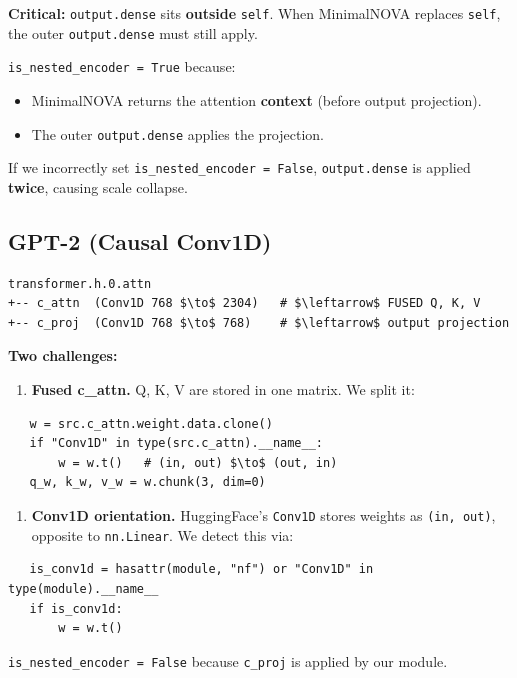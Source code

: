 \textbf{Critical:} \texttt{output.dense} sits \textbf{outside} \texttt{self}. When MinimalNOVA 
replaces \texttt{self}, the outer \texttt{output.dense} must still apply.

\texttt{is\_nested\_encoder = True} because:
\begin{itemize}
\item MinimalNOVA returns the attention \textbf{context} (before output projection).
\item The outer \texttt{output.dense} applies the projection.

\end{itemize}
If we incorrectly set \texttt{is\_nested\_encoder = False}, \texttt{output.dense} is applied 
\textbf{twice}, causing scale collapse.

\subsection{GPT-2 (Causal Conv1D)}

\begin{lstlisting}
transformer.h.0.attn
+-- c_attn  (Conv1D 768 $\to$ 2304)   # $\leftarrow$ FUSED Q, K, V
+-- c_proj  (Conv1D 768 $\to$ 768)    # $\leftarrow$ output projection
\end{lstlisting}

\textbf{Two challenges:}

\begin{enumerate}
\item \textbf{Fused c\_attn.} Q, K, V are stored in one matrix. We split it:
\end{enumerate}
\begin{lstlisting}
   w = src.c_attn.weight.data.clone()
   if "Conv1D" in type(src.c_attn).__name__:
       w = w.t()   # (in, out) $\to$ (out, in)
   q_w, k_w, v_w = w.chunk(3, dim=0)
\end{lstlisting}

\begin{enumerate}
\item \textbf{Conv1D orientation.} HuggingFace's \texttt{Conv1D} stores weights as
  \texttt{(in, out)}, opposite to \texttt{nn.Linear}. We detect this via:
\end{enumerate}
\begin{lstlisting}
   is_conv1d = hasattr(module, "nf") or "Conv1D" in type(module).__name__
   if is_conv1d:
       w = w.t()
\end{lstlisting}

\texttt{is\_nested\_encoder = False} because \texttt{c\_proj} is applied by our module.

